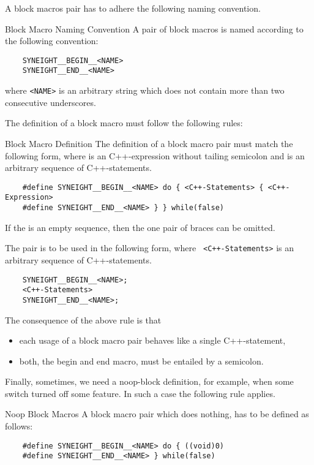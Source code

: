 A block macros pair has to adhere the following naming convention.
%
\begin{rule*}{Block Macro Naming Convention}
  A pair of block macros is named according to the following convention:
  \begin{verbatim}
    SYNEIGHT__BEGIN__<NAME>
    SYNEIGHT__END__<NAME>
  \end{verbatim}
  where {\tt <NAME>} is an arbitrary string which does not contain
  more than two consecutive underscores.
\end{rule*}
%
The definition of a block macro must follow the following rules:
%
\begin{rule*}{Block Macro Definition}
  The definition of a block macro pair must match the following form,
  where {\tt <C++-Expression>} is an C++-expression without tailing
  semicolon and {\tt <C++-Statements>} is an arbitrary sequence of
  C++-statements.
  \begin{verbatim}
    #define SYNEIGHT__BEGIN__<NAME> do { <C++-Statements> { <C++-Expression>
    #define SYNEIGHT__END__<NAME> } } while(false)
  \end{verbatim}
  If the {\tt <C++-Statements>} is an empty sequence, then the one
  pair of braces can be omitted. 
\end{rule*}
%
The pair is to be used in the following form, where {\tt
  <C++-Statements>} is an arbitrary sequence of C++-statements.
\begin{verbatim}
    SYNEIGHT__BEGIN__<NAME>;
    <C++-Statements>
    SYNEIGHT__END__<NAME>;
\end{verbatim}
%
The consequence of the above rule is that 
\begin{itemize}
\item each usage of a block macro pair behaves like a single
  C++-statement,
\item both, the begin and end macro, must be entailed by a semicolon.
\end{itemize}
%
Finally, sometimes, we need a noop-block definition, for example, when
some switch turned off some feature. In such a case the following rule applies. 
%
\begin{rule*}{Noop Block Macros}
  A block macro pair which does nothing, has to be
  defined as follows:
  \begin{verbatim}
    #define SYNEIGHT__BEGIN__<NAME> do { ((void)0)
    #define SYNEIGHT__END__<NAME> } while(false)
  \end{verbatim}
\end{rule*}



